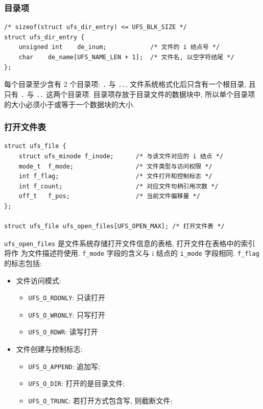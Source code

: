 \documentclass[nofonts, titlepage]{ctexart}
\begin{document}
\subsubsection{目录项}\label{ux76eeux5f55ux9879}

\begin{verbatim}
/* sizeof(struct ufs_dir_entry) <= UFS_BLK_SIZE */
struct ufs_dir_entry {
    unsigned int    de_inum;            /* 文件的 i 结点号 */
    char    de_name[UFS_NAME_LEN + 1];  /* 文件名, 以空字符结尾 */
};
\end{verbatim}

每个目录至少含有 2 个目录项: \texttt{.} 与 \texttt{..},
文件系统格式化后只含有一个根目录, 且只有 \texttt{.} 与 \texttt{..}
这两个目录项. 目录项存放于目录文件的数据块中,
所以单个目录项的大小必须小于或等于一个数据块的大小.

\subsubsection{打开文件表}\label{ux6253ux5f00ux6587ux4ef6ux8868}

\begin{verbatim}
struct ufs_file {
    struct ufs_minode f_inode;      /* 与该文件对应的 i 结点 */
    mode_t  f_mode;                 /* 文件类型与访问权限 */
    int f_flag;                     /* 文件打开和控制标志 */
    int f_count;                    /* 对应文件句柄引用次数 */
    off_t   f_pos;                  /* 当前文件偏移量 */
};

struct ufs_file ufs_open_files[UFS_OPEN_MAX]; /* 打开文件表 */
\end{verbatim}

\texttt{ufs\_open\_files} 是文件系统存储打开文件信息的表格,
打开文件在表格中的索引将作 为文件描述符使用. \texttt{f\_mode}
字段的含义与 i 结点的 \texttt{i\_mode} 字段相同. \texttt{f\_flag}
的标志包括:
\begin{itemize}
    \item
        文件访问模式: 
        \begin{itemize}
            \item
                \texttt{UFS\_O\_RDONLY}: 只读打开
            \item
                \texttt{UFS\_O\_WRONLY}: 只写打开
            \item
                \texttt{UFS\_O\_RDWR}: 读写打开
        \end{itemize}
    \item
        文件创建与控制标志: 
        \begin{itemize}
            \item
                \texttt{UFS\_O\_APPEND}: 追加写; 
            \item
                \texttt{UFS\_O\_DIR}: 打开的是目录文件;
            \item
                \texttt{UFS\_O\_TRUNC}:
                若打开方式包含写, 则截断文件;
        \end{itemize}
\end{itemize}
\end{document}
